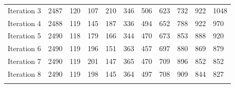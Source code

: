 \documentclass[sn-mathphys-num]{sn-jnl}%
\theoremstyle{thmstyleone}%
\theoremstyle{thmstyletwo}%
\theoremstyle{thmstylethree}%
\begin{document}
\begin{table}[h]
\begin{tabular}{@{}lllllllllll@{}}
    Iteration 3 & 2487    &     120   &      107    &     210    &     346 &
        506     &    623   &      732    &     922  &      1048  \\
   Iteration 4 &  2488     &   119      &  145 &       187       & 336&
        494  &      652   &     788&        922    &   970 \\
    Iteration 5 &2490    &    118   &     179      &  166    &    344 &
        470     &   673   &     853    &    888      &  920   \\
    Iteration 6 & 2490     &   119    &    196    &    151      &  363& 
        457 &       697   &    880   &     869    &    879  \\
    Iteration 7 &  2490    &    119  &      201   &     147    &    365 &
        470    &    709   &     896  &      852   &     852 \\
    Iteration 8 & 2490     &   119  &     198    &    145   &     364 &
        497    &    708     &   909    &    844      &  827  \\
    \botrule
\end{tabular}
\label{AppC}
\end{table}
\end{document}
